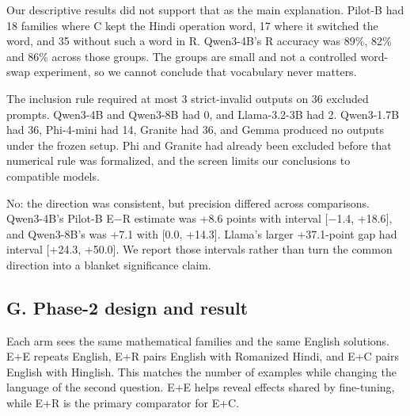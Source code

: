 \medskip{}\par\nopagebreak

Our descriptive results did not support that as the main explanation. Pilot-B had 18 families where C kept the Hindi operation word, 17 where it switched the word, and 35 without such a word in R. Qwen3-4B's R accuracy was 89\%, 82\% and 86\% across those groups. The groups are small and not a controlled word-swap experiment, so we cannot conclude that vocabulary never matters.

\medskip{}\par\nopagebreak

The inclusion rule required at most 3 strict-invalid outputs on 36 excluded prompts. Qwen3-4B and Qwen3-8B had 0, and Llama-3.2-3B had 2. Qwen3-1.7B had 36, Phi-4-mini had 14, Granite had 36, and Gemma produced no outputs under the frozen setup. Phi and Granite had already been excluded before that numerical rule was formalized, and the screen limits our conclusions to compatible models.

\medskip{}\par\nopagebreak

No: the direction was consistent, but precision differed across comparisons. Qwen3-4B's Pilot-B E−R estimate was +8.6 points with interval [−1.4, +18.6], and Qwen3-8B's was +7.1 with [0.0, +14.3]. Llama's larger +37.1-point gap had interval [+24.3, +50.0]. We report those intervals rather than turn the common direction into a blanket significance claim.

\subsection*{G. Phase-2 design and result}


\medskip{}\par\nopagebreak

Each arm sees the same mathematical families and the same English solutions. E+E repeats English, E+R pairs English with Romanized Hindi, and E+C pairs English with Hinglish. This matches the number of examples while changing the language of the second question. E+E helps reveal effects shared by fine-tuning, while E+R is the primary comparator for E+C.


